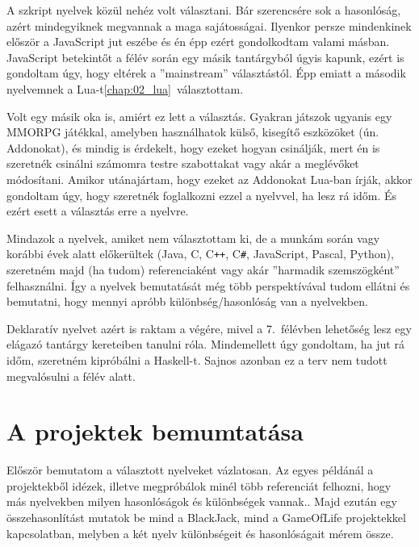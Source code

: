 A szkript nyelvek közül nehéz volt választani. Bár szerencsére sok a hasonlóság, azért mindegyiknek megvannak a maga sajátosságai. Ilyenkor persze mindenkinek először a JavaScript jut eszébe és én épp ezért gondolkodtam valami másban. JavaScript betekintőt a félév során egy másik tantárgyból úgyis kapunk, ezért is gondoltam úgy, hogy eltérek a ''mainstream'' választástól. Épp emiatt a második nyelvemnek a Lua-t\ref{chap:02_lua}~választottam. 

Volt egy másik oka is, amiért ez lett a választás. Gyakran játszok ugyanis egy MMORPG játékkal, amelyben használhatok külső, kisegítő eszközöket (ún. Addonokat), és mindig is érdekelt, hogy ezeket hogyan csinálják, mert én is szeretnék csinálni számomra testre szabottakat vagy akár a meglévőket módosítani. Amikor utánajártam, hogy ezeket az Addonokat Lua-ban írják, akkor gondoltam úgy, hogy szeretnék foglalkozni ezzel a nyelvvel, ha lesz rá időm. És ezért esett a választás erre a nyelvre.

Mindazok a nyelvek, amiket nem választottam ki, de a munkám során vagy korábbi évek alatt előkerültek (Java, C, C\verb|++|, C\verb|#|, JavaScript, Pascal, Python), szeretném majd (ha tudom) referenciaként vagy akár ''harmadik szemszögként'' felhasználni. Így a nyelvek bemutatását még több perspektívával tudom ellátni és bemutatni, hogy mennyi apróbb különbség/hasonlóság van a nyelvekben.

Deklaratív nyelvet azért is raktam a végére, mivel a 7.~félévben lehetőség lesz egy elágazó tantárgy kereteiben tanulni róla. Mindemellett úgy gondoltam, ha jut rá időm, szeretném kipróbálni a Haskell-t. Sajnos azonban ez a terv nem tudott megvalósulni a félév alatt.


\section{A projektek bemumtatása}

Először bemutatom a választott nyelveket vázlatosan. Az egyes példánál a projektekből idézek, illetve megpróbálok minél több referenciát felhozni, hogy más nyelvekben milyen hasonlóságok és különbségek vannak.. Majd ezután egy összehasonlítást mutatok be mind a BlackJack, mind a GameOfLife projektekkel kapcsolatban, melyben a két nyelv különbségeit és hasonlóságait mérem össze.
 

